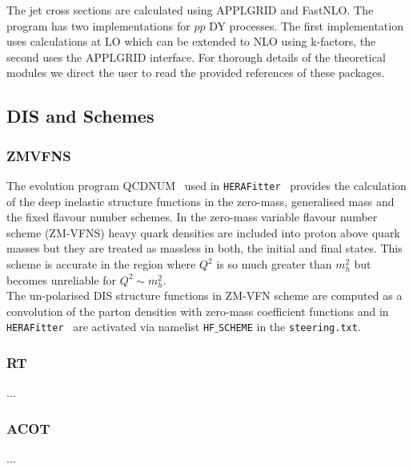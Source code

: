 \documentclass[11pt,a4paper]{article}
\newcommand\fitter{ \mbox{\tt HERAFitter} }
\begin{document}
The jet cross sections
are calculated using APPLGRID and FastNLO. The program has two implementations
for $pp$  DY processes. The first implementation uses
calculations at LO which can be extended to NLO using k-factors,
the second uses the APPLGRID interface.
For thorough details of the theoretical modules we direct the user to read the provided  references of these packages.


\subsection{DIS and Schemes}
\subsubsection{ZMVFNS}
The evolution program QCDNUM~\cite{qcdnum} used in \fitter\ provides 
the calculation of the deep inelastic structure functions in the zero-mass, 
generalised mass and the fixed flavour number schemes. 
In the zero-mass variable flavour number scheme (ZM-VFNS) heavy quark densities are
included into proton above quark masses but they are treated as massless in both,
the initial and final states.
This scheme is accurate in the region where $Q^2$ is so much greater than $m_h^2$
but becomes unreliable for $Q^2 \sim m_h^2$. \\
The un-polarised DIS structure functions in ZM-VFN scheme are computed as a 
convolution of the parton densities with zero-mass coefficient functions and 
in \fitter\ are activated via namelist {\tt HF$\_$SCHEME} in the {\tt steering.txt}.
\subsubsection{RT}
... 
\subsubsection{ACOT}
...
\end{document}
